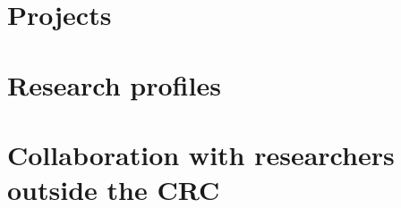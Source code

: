 \documentclass[final, headinclude=false, chapterprefix=false, fontsize=10pt,
  paper=A4, headings=small, bibliography=leveldown, toc=graduated,
  reqno,titlepage,twoside=true,open=any]
  {scrbook}
\begin{document}

\frontmatter
\maketitle
\tableofcontents
\mainmatter




\chapter{Projects}
\thispagestyle{empty}
\label{chap:projects}



\newpage

\printbibliography[heading=bibliographysection,title={Bibliography}]


\appendix

\chapter{Research profiles}
\addtocounter{page}{-1}
\thispagestyle{empty}



\chapter{Collaboration with researchers outside the CRC}



\chapter{\sigpl}
\markboth{\sigpl}{\sigpl}
\thispagestyle{empty}
\newpage



%

\backmatter
\end{document}
